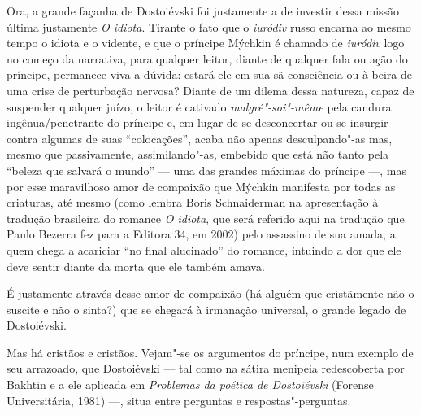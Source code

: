 Ora, a grande façanha de Dostoiévski foi justamente a de investir dessa
missão última justamente \emph{O idiota}. Tirante o fato que
o \emph{iuródiv} russo encarna ao mesmo tempo o idiota e o vidente, e
que o príncipe Mýchkin é chamado de \emph{iuródiv} logo no começo da
narrativa, para qualquer leitor, diante de qualquer fala ou ação do
príncipe, permanece viva a dúvida: estará ele em sua sã consciência ou à
beira de uma crise de perturbação nervosa? Diante de um dilema dessa
natureza, capaz de suspender qualquer juízo, o leitor é
cativado \emph{malgré"-soi"-même} pela candura ingênua/penetrante do
príncipe e, em lugar de se desconcertar ou se insurgir contra algumas
de suas ``colocações'', acaba não apenas desculpando"-as mas, mesmo que
passivamente, assimilando"-as, embebido que está não tanto pela ``beleza que salvará o mundo'' --- uma das grandes máximas do príncipe
---, mas por esse maravilhoso amor de compaixão que Mýchkin manifesta
por todas as criaturas, até mesmo (como lembra Boris Schnaiderman na
apresentação à tradução brasileira do romance \emph{O idiota}, que
será referido aqui na tradução que Paulo Bezerra
fez para a Editora 34, em 2002) pelo assassino de sua amada, a
quem chega a acariciar ``no final alucinado'' do romance, intuindo a
dor que ele deve sentir diante da morta que ele também amava.

É justamente através desse amor de compaixão (há alguém que cristãmente
não o suscite e não o sinta?) que se chegará à irmanação universal, o
grande legado de Dostoiévski.

Mas há cristãos e cristãos. Vejam"-se os argumentos do príncipe,
num exemplo de seu arrazoado, que Dostoiévski --- tal como na sátira
menipeia redescoberta por Bakhtin e a ele aplicada em \emph{Problemas da
poética de Dostoiévski} (Forense Universitária, 1981) ---, situa entre
perguntas e respostas"-perguntas.

